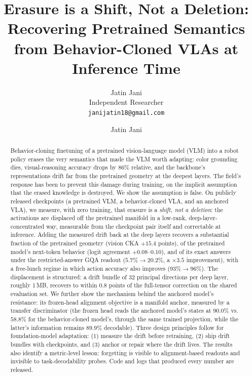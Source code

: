 \documentclass{article}
\title{Erasure is a Shift, Not a Deletion: Recovering Pretrained Semantics from Behavior-Cloned VLAs at Inference Time}
\date{}
\author{%
	Jatin Jani \\
	Independent Researcher\\
	\texttt{janijatin18@gmail.com} \\
}
\author[1]{%
	Jatin Jani%
}
\affil[1]{Independent Researcher}
\begin{document}
\maketitle

\begin{abstract}
Behavior-cloning finetuning of a pretrained vision-language model (VLM) into a robot policy
erases the very semantics that made the VLM worth adapting: color grounding dies,
visual-reasoning accuracy drops by $86\%$ relative, and the backbone's representations
drift far from the pretrained geometry at the deepest layers. The field's response has been
to prevent this damage during training, on the implicit assumption that the erased knowledge
is destroyed. We show the assumption is false. On publicly released checkpoints (a
pretrained VLM, a behavior-cloned VLA, and an anchored VLA), we measure, with zero
training, that erasure is a \emph{shift, not a deletion}: the activations are displaced off
the pretrained manifold in a low-rank, deep-layer-concentrated way, measurable from the
checkpoint pair itself and correctable at inference. Adding the measured drift back at the
deep layers recovers a substantial fraction of the pretrained geometry (vision CKA $+15.4$
points), of the pretrained model's next-token behavior (logit agreement $+0.08$--$0.10$),
and of its exact answers under the restricted-answer GQA readout ($5.7\% \rightarrow 20.2\%$,
a $\times 3.5$ improvement), with a free-lunch regime in which action accuracy also
improves ($93\% \rightarrow 96\%$). The displacement is structured: a drift bundle of 32
principal directions per deep layer, roughly 1\,MB, recovers to within $0.8$ points of the
full-tensor correction on the shared evaluation set. We further show the mechanism behind the anchored
model's resistance: its frozen-head alignment objective is a manifold anchor, measured by a
transfer discriminator (the frozen head reads the anchored model's states at $90.0\%$
vs.\ $58.8\%$ for the behavior-cloned model's, through the same trained projection, while
the latter's information remains $89.9\%$ decodable). Three design principles follow for
foundation-model adaptation: (1) measure the drift before retraining, (2) ship drift bundles
with checkpoints, and (3) anchor or repair where the drift lives. The results also identify
a metric-level lesson: forgetting is visible to alignment-based readouts and invisible to
task-decodability probes. Code and logs that produced every number are released.
\end{abstract}
\end{document}
